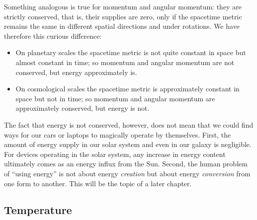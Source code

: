 \documentclass[a4paper,12pt,%
onecolumn,oneside,titlepage,%
british%
]{memoir}
\newcommand{\mynotew}[1]{{\footnotesize\color{midgrey}\faIcon{tools}\ #1}}
\renewcommand*{\|}[1][]{\nonscript\:#1\vert\nonscript\:\mathopen{}}
\begin{document}
\smallskip

Something analogous is true for momentum and angular momentum: they are strictly conserved, that is, their supplies are zero, only if the spacetime metric remains the same in different spatial directions and under rotations. We have therefore this curious difference:
\begin{itemize}
\item On planetary scales the spacetime metric is not quite constant in space but almost constant in time; so momentum and angular momentum are not conserved, but energy approximately is.
\item On cosmological scales the spacetime metric is approximately constant in space but not in time; so momentum and angular momentum are approximately conserved, but energy is not.
\end{itemize}

\medskip

The fact that energy is not conserved, however, does not mean that we could find ways for our cars or laptops to magically operate by themselves. First, the amount of energy supply in our solar system and even in our galaxy is negligible. %
For devices operating in the solar system, any increase in energy content ultimately comes as an energy influx from the Sun. Second, the human problem of \enquote{using energy} is not about energy \emph{creation} but about energy \emph{conversion} from one form to another. This will be the topic of a later chapter.

\subsection{Temperature}
\label{sec:temperature}
\end{document}
